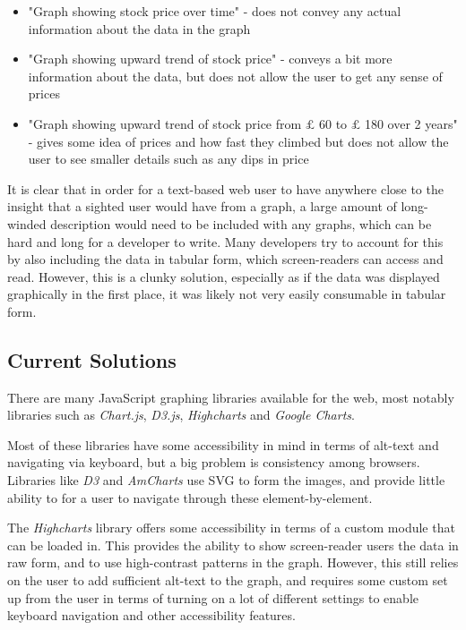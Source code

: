 \documentclass[ %
                    author={Aleena Baig},
                supervisor={Dr Simon Lock},
                    degree={BSc},
                     title={On Making Web Accessible Graphs},
                  subtitle={},
                      year={2019} ]{dissertation}
\begin{document}
\begin{itemize}
    \item "Graph showing stock price over time" - does not convey any actual information about the data in the graph
    \item "Graph showing upward trend of stock price" - conveys a bit more information about the data, but does not allow the user to get any sense of prices
    \item "Graph showing upward trend of stock price from $\pounds$ 60 to $\pounds$ 180 over 2 years" - gives some idea of prices and how fast they climbed but does not allow the user to see smaller details such as any dips in price
\end{itemize}
%
It is clear that in order for a text-based web user to have anywhere close to the insight that a sighted user would have from a graph, a large amount of long-winded description would need to be included with any graphs, which can be hard and long for a developer to write. Many developers try to account for this by also including the data in tabular form, which screen-readers can access and read. However, this is a clunky solution, especially as if the data was displayed graphically in the first place, it was likely not very easily consumable in tabular form.

\subsection{Current Solutions}

There are many JavaScript graphing libraries available for the web, most notably libraries such as \textit{Chart.js}, \textit{D3.js}, \textit{Highcharts} and \textit{Google Charts}.

Most of these libraries have some accessibility in mind in terms of alt-text and navigating via keyboard, but a big problem is consistency among browsers. Libraries like \textit{D3} and \textit{AmCharts} use SVG to form the images, and provide little ability to for a user to navigate through these element-by-element.

The \textit{Highcharts} library offers some accessibility in terms of a custom module that can be loaded in. This provides the ability to show screen-reader users the data in raw form, and to use high-contrast patterns in the graph. However, this still relies on the user to add sufficient alt-text to the graph, and requires some custom set up from the user in terms of turning on a lot of different settings to enable keyboard navigation and other accessibility features.
\end{document}
